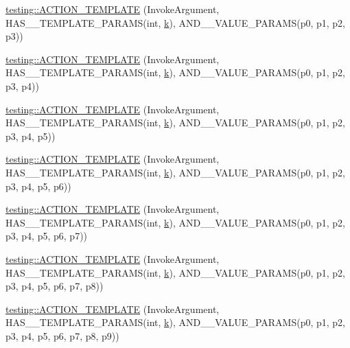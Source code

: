 \begin{DoxyCompactItemize}
\item 
\hyperlink{namespacetesting_ae98e43eecf8f44990b39b460f00b397b}{testing\+::\+A\+C\+T\+I\+O\+N\+\_\+\+T\+E\+M\+P\+L\+A\+TE} (Invoke\+Argument, H\+A\+S\+\_\+\_\+\+T\+E\+M\+P\+L\+A\+T\+E\+\_\+\+P\+A\+R\+A\+MS(int, \hyperlink{jquery_8js_ab26645c014aa005ecedef329ecf58c99}{k}), A\+N\+D\+\_\+\_\+\+V\+A\+L\+U\+E\+\_\+\+P\+A\+R\+A\+MS(p0, p1, p2, p3))
\item 
\hyperlink{namespacetesting_a505f6d82df233802c5f4235d77dca164}{testing\+::\+A\+C\+T\+I\+O\+N\+\_\+\+T\+E\+M\+P\+L\+A\+TE} (Invoke\+Argument, H\+A\+S\+\_\+\_\+\+T\+E\+M\+P\+L\+A\+T\+E\+\_\+\+P\+A\+R\+A\+MS(int, \hyperlink{jquery_8js_ab26645c014aa005ecedef329ecf58c99}{k}), A\+N\+D\+\_\+\_\+\+V\+A\+L\+U\+E\+\_\+\+P\+A\+R\+A\+MS(p0, p1, p2, p3, p4))
\item 
\hyperlink{namespacetesting_ab85e5f54a209bf141fc04f8612fbe887}{testing\+::\+A\+C\+T\+I\+O\+N\+\_\+\+T\+E\+M\+P\+L\+A\+TE} (Invoke\+Argument, H\+A\+S\+\_\+\_\+\+T\+E\+M\+P\+L\+A\+T\+E\+\_\+\+P\+A\+R\+A\+MS(int, \hyperlink{jquery_8js_ab26645c014aa005ecedef329ecf58c99}{k}), A\+N\+D\+\_\+\_\+\+V\+A\+L\+U\+E\+\_\+\+P\+A\+R\+A\+MS(p0, p1, p2, p3, p4, p5))
\item 
\hyperlink{namespacetesting_a8d3590561f334d165c620f522219831b}{testing\+::\+A\+C\+T\+I\+O\+N\+\_\+\+T\+E\+M\+P\+L\+A\+TE} (Invoke\+Argument, H\+A\+S\+\_\+\_\+\+T\+E\+M\+P\+L\+A\+T\+E\+\_\+\+P\+A\+R\+A\+MS(int, \hyperlink{jquery_8js_ab26645c014aa005ecedef329ecf58c99}{k}), A\+N\+D\+\_\+\_\+\+V\+A\+L\+U\+E\+\_\+\+P\+A\+R\+A\+MS(p0, p1, p2, p3, p4, p5, p6))
\item 
\hyperlink{namespacetesting_a8725892aafb62cc8f6f76280d29595d8}{testing\+::\+A\+C\+T\+I\+O\+N\+\_\+\+T\+E\+M\+P\+L\+A\+TE} (Invoke\+Argument, H\+A\+S\+\_\+\_\+\+T\+E\+M\+P\+L\+A\+T\+E\+\_\+\+P\+A\+R\+A\+MS(int, \hyperlink{jquery_8js_ab26645c014aa005ecedef329ecf58c99}{k}), A\+N\+D\+\_\+\_\+\+V\+A\+L\+U\+E\+\_\+\+P\+A\+R\+A\+MS(p0, p1, p2, p3, p4, p5, p6, p7))
\item 
\hyperlink{namespacetesting_a910551adbfeb1854071ef55ae54a5c0f}{testing\+::\+A\+C\+T\+I\+O\+N\+\_\+\+T\+E\+M\+P\+L\+A\+TE} (Invoke\+Argument, H\+A\+S\+\_\+\_\+\+T\+E\+M\+P\+L\+A\+T\+E\+\_\+\+P\+A\+R\+A\+MS(int, \hyperlink{jquery_8js_ab26645c014aa005ecedef329ecf58c99}{k}), A\+N\+D\+\_\+\_\+\+V\+A\+L\+U\+E\+\_\+\+P\+A\+R\+A\+MS(p0, p1, p2, p3, p4, p5, p6, p7, p8))
\item 
\hyperlink{namespacetesting_ab7bf885ff274cbdc09f19c39e43b7f2b}{testing\+::\+A\+C\+T\+I\+O\+N\+\_\+\+T\+E\+M\+P\+L\+A\+TE} (Invoke\+Argument, H\+A\+S\+\_\+\_\+\+T\+E\+M\+P\+L\+A\+T\+E\+\_\+\+P\+A\+R\+A\+MS(int, \hyperlink{jquery_8js_ab26645c014aa005ecedef329ecf58c99}{k}), A\+N\+D\+\_\+\_\+\+V\+A\+L\+U\+E\+\_\+\+P\+A\+R\+A\+MS(p0, p1, p2, p3, p4, p5, p6, p7, p8, p9))

\end{DoxyCompactItemize}
